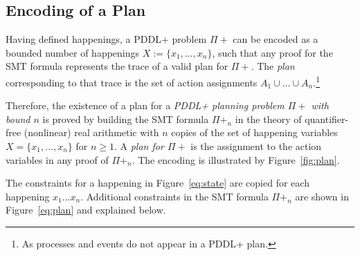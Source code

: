 \subsection{Encoding of a Plan}\label{sec:enc_problem}

Having defined happenings, a PDDL+ problem $\Pi+$ can be encoded as a bounded number of happenings $X:=\{x_1,\ldots,x_n\}$, such that any proof for the SMT formula represents the trace of a valid plan for $\Pi+$. The \textit{plan} corresponding to that trace is the set of action assignments $A_1\cup \ldots\cup A_n$.\footnote{As processes and events do not appear in a PDDL+ plan.}

Therefore, the existence of a plan for a  {\sl PDDL+ planning problem $\Pi+$ with bound $n$} is proved by building the SMT formula $\Pi+_n$ in the theory of quantifier-free (nonlinear) real arithmetic with $n$ copies of the set of happening variables $X = \{x_1,\ldots,x_n\}$ for $n \geq 1$. A \textit{plan for $\Pi+$} is the assignment to the action variables in any proof of $\Pi+_n$. The encoding is illustrated by Figure~\ref{fig:plan}.

\begin{figure*}[htb!]
\center

\caption{A plan is found by building a formula with $n$ copies of the set of variables $x_t$ for $t = 1 \ldots n$. Each Happening models discrete change. Between happenings there is only continuous numeric change. The initial state is modelled in $t_1$, and the goal constraints are added to $t_n$.}
\label{fig:plan}
\end{figure*}

\noindent The constraints for a happening in Figure~\ref{eq:state} are copied for each happening $x_1 \ldots x_n$. Additional constraints in the SMT formula $\Pi+_n$ are shown in Figure~\ref{eq:plan} and explained below.

